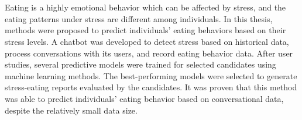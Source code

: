 \chapter{\abstractname}

Eating is a highly emotional behavior which can be affected by stress, and the eating patterns under stress are different among individuals. In this thesis, methods were proposed to predict individuals' eating behaviors based on their stress levels. A chatbot was developed to detect stress based on historical data, process conversations with its users, and record eating behavior data. After user studies, several predictive models were trained for selected candidates using machine learning methods. The best-performing models were selected to generate stress-eating reports evaluated by the candidates. It was proven that this method was able to predict individuals' eating behavior based on conversational data, despite the relatively small data size.
